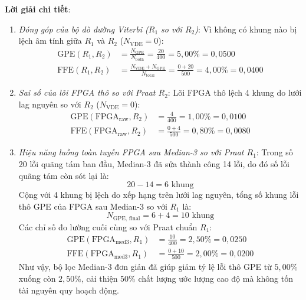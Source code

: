 \textbf{Lời giải chi tiết}:
\begin{enumerate}[label=(\alph*)]
    \item \emph{Đóng góp của bộ dò đường Viterbi ($R_1$ so với $R_2$)}:
    Vì không có khung nào bị lệch âm tính giữa $R_1$ và $R_2$ ($N_{\text{VDE}} = 0$):
    \begin{align}
        \text{GPE}(R_1, R_2) &= \frac{N_{\text{GPE}}}{N_{\text{both}}} = \frac{20}{400} = 5{,}00\% = 0{,}0500 \\
        \text{FFE}(R_1, R_2) &= \frac{N_{\text{VDE}} + N_{\text{GPE}}}{N_{\text{total}}} = \frac{0 + 20}{500} = 4{,}00\% = 0{,}0400
    \end{align}

    \item \emph{Sai số của lõi FPGA thô so với Praat $R_2$}:
    Lõi FPGA thô lệch 4 khung do lưới lag nguyên so với $R_2$ ($N_{\text{VDE}} = 0$):
    \begin{align}
        \text{GPE}(\text{FPGA}_{\text{raw}}, R_2) &= \frac{4}{400} = 1{,}00\% = 0{,}0100 \\
        \text{FFE}(\text{FPGA}_{\text{raw}}, R_2) &= \frac{0 + 4}{500} = 0{,}80\% = 0{,}0080
    \end{align}

    \item \emph{Hiệu năng luồng toàn tuyến FPGA sau Median-3 so với Praat $R_1$}:
    Trong số 20 lỗi quãng tám ban đầu, Median-3 đã sửa thành công 14 lỗi, do đó số lỗi quãng tám còn sót lại là:
    \begin{equation}
        20 - 14 = 6\text{ khung}
    \end{equation}
    Cộng với 4 khung bị lệch do xếp hạng trên lưới lag nguyên, tổng số khung lỗi thô GPE của FPGA sau Median-3 so với $R_1$ là:
    \begin{equation}
        N_{\text{GPE, final}} = 6 + 4 = 10\text{ khung}
    \end{equation}
    Các chỉ số đo lường cuối cùng so với Praat chuẩn $R_1$:
    \begin{align}
        \text{GPE}(\text{FPGA}_{\text{med3}}, R_1) &= \frac{10}{400} = 2{,}50\% = 0{,}0250 \\
        \text{FFE}(\text{FPGA}_{\text{med3}}, R_1) &= \frac{0 + 10}{500} = 2{,}00\% = 0{,}0200
    \end{align}
    Như vậy, bộ lọc Median-3 đơn giản đã giúp giảm tỷ lệ lỗi thô GPE từ $5{,}00\%$ xuống còn $2{,}50\%$, cải thiện $50\%$ chất lượng ước lượng cao độ mà không tốn tài nguyên quy hoạch động.
\end{enumerate}

